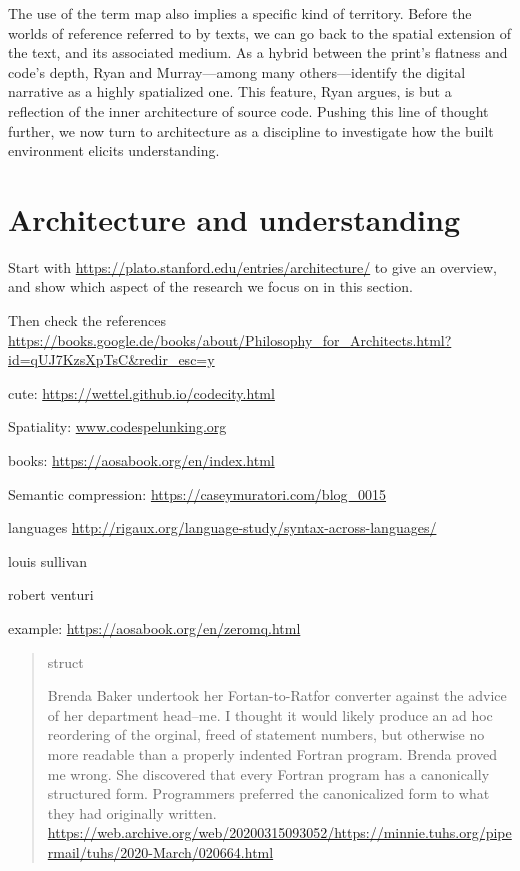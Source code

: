 The use of the term map also implies a specific kind of territory. Before the worlds of reference referred to by texts, we can go back to the spatial extension of the text, and its associated medium. As a hybrid between the print's flatness and code's depth, Ryan and Murray—among many others—identify the digital narrative as a highly spatialized one. This feature, Ryan argues, is but a reflection of the inner architecture of source code. Pushing this line of thought further, we now turn to architecture as a discipline to investigate how the built environment elicits understanding.

\section{Architecture and understanding}
\label{sec:arch-understanding}


Start with \url{https://plato.stanford.edu/entries/architecture/} to give an overview, and show which aspect of the research we focus on in this section.

Then check the references \url{https://books.google.de/books/about/Philosophy_for_Architects.html?id=qUJ7KzsXpTsC&redir_esc=y}

cute: \url{https://wettel.github.io/codecity.html}

Spatiality: \url{www.codespelunking.org}

books: \url{https://aosabook.org/en/index.html}

Semantic compression: \url{https://caseymuratori.com/blog_0015}

languages \url{http://rigaux.org/language-study/syntax-across-languages/}


louis sullivan

robert venturi

example: \url{https://aosabook.org/en/zeromq.html}

\begin{quote}
    struct

Brenda Baker undertook her Fortan-to-Ratfor converter against the advice
of her department head--me. I thought it would likely produce an ad hoc
reordering of the orginal, freed of statement numbers, but otherwise no
more readable than a properly indented Fortran program. Brenda proved
me wrong. She discovered that every Fortran program has a canonically
structured form. Programmers preferred the canonicalized form to what
they had originally written. \url{https://web.archive.org/web/20200315093052/https://minnie.tuhs.org/pipermail/tuhs/2020-March/020664.html}
\end{quote}

